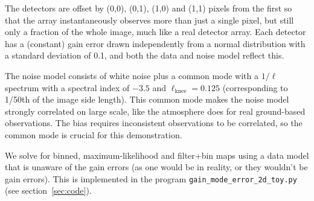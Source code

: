 \documentclass[twocolumn,apj]{aastex63}
\begin{document}
The detectors are offset by
(0,0), (0,1), (1,0) and (1,1) pixels from the first so that the array instantaneously
observes more than just a single pixel, but still only a fraction of the whole image, much like
a real detector array. Each detector has a (constant) gain error drawn
independently from a normal distribution with a standard deviation of 0.1, and both the
data and noise model reflect this.

The noise model consists of white noise plus a
common mode with a $1/\ell$ spectrum with a spectral index of $-3.5$ and $\ell_\text{knee} = 0.125$
(corresponding to 1/50th of the image side length). This common mode makes the noise model
strongly correlated on large scale, like the atmosphere does for real ground-based observations.
The bias requires inconsistent observations to be correlated, so the common mode is crucial for
this demonstration.

We solve for binned, maximum-likelihood and filter+bin
maps using a data model that is unaware of the gain errors (as one would be in reality,
or they wouldn't be gain errors). This is implemented in the program \verb|gain_mode_error_2d_toy.py|
(see section~\ref{sec:code}).
\end{document}
